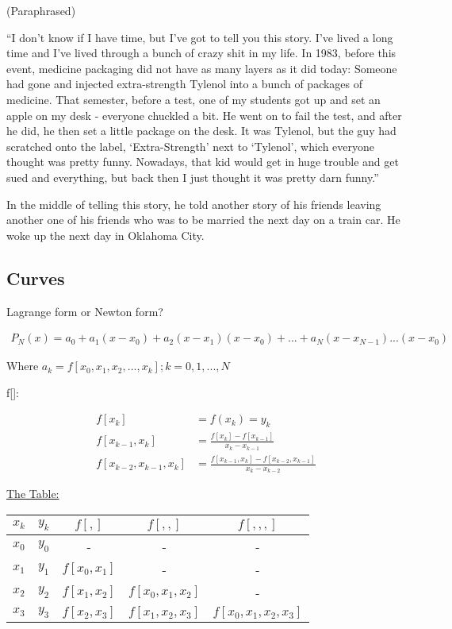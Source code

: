 (Paraphrased)

``I don't know if I have time, but I've got to tell you this story. I've lived a long time and I've lived through a bunch of crazy shit in my life. In 1983, before this event, medicine packaging did not have as many layers as it did today: Someone had gone and injected extra-strength Tylenol into a bunch of packages of medicine. That semester, before a test, one of my students got up and set an apple on my desk - everyone chuckled a bit. He went on to fail the test, and after he did, he then set a little package on the desk. It was Tylenol, but the guy had scratched onto the label, `Extra-Strength' next to `Tylenol', which everyone thought was pretty funny. Nowadays, that kid would get in huge trouble and get sued and everything, but back then I just thought it was pretty darn funny.''

In the middle of telling this story, he told another story of his friends leaving another one of his friends who was to be married the next day on a train car. He woke up the next day in Oklahoma City.

\subsection{Curves}

Lagrange form or Newton form?

\begin{align*}
  P_N(x) = a_0 + a_1 (x - x_0) + a_2 (x - x_1) (x - x_0) + ... + a_N (x - x_{N-1}) ... (x - x_0)
\end{align*}

Where $a_k = f[x_0, x_1, x_2, ..., x_k]; k = 0, 1, ..., N$

f[]:

\begin{align*}
  f[x_k]                   &= f(x_k) = y_k \\
  f[x_{k-1}, x_k]          &= \frac{f[x_k] - f[x_{k-1}]}{x_k - x_{k-1}} \\
  f[x_{k-2}, x_{k-1}, x_k] &= \frac{f[x_{k-1}, x_k] - f[x_{k-2}, x_{k-1}]}{x_k - x_{k-2}}
\end{align*}

\underline{The Table:}

\begin{tabular}{ |c|c|c|c|c| }
$x_k$ & $y_k$ & $f[,]$        & $f[,,]$            & $f[,,,]$\\
\hline
$x_0$ & $y_0$ & -             & -                  & - \\
$x_1$ & $y_1$ & $f[x_0, x_1]$ & -                  & - \\
$x_2$ & $y_2$ & $f[x_1, x_2]$ & $f[x_0, x_1, x_2]$ & - \\
$x_3$ & $y_3$ & $f[x_2, x_3]$ & $f[x_1, x_2, x_3]$ & $f[x_0, x_1, x_2, x_3]$
\end{tabular}